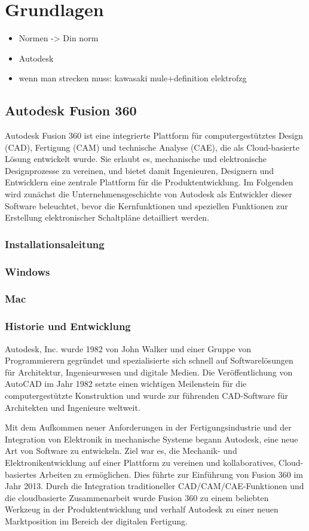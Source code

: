 \chapter{Grundlagen}
\label{cha:Grundlagen}
	\begin{itemize}
	\item Normen -> Din norm
	\item Autodesk
	\item wenn man strecken muss: kawasaki mule+definition elektrofzg
\end{itemize}
\section{Autodesk Fusion 360}
\label{Autodesk}
Autodesk Fusion 360 ist eine integrierte Plattform für computergestütztes Design (CAD), Fertigung (CAM) und technische Analyse (CAE), die als Cloud-basierte Lösung entwickelt wurde. Sie erlaubt es, mechanische und elektronische Designprozesse zu vereinen, und bietet damit Ingenieuren, Designern und Entwicklern eine zentrale Plattform für die Produktentwicklung. Im Folgenden wird zunächst die Unternehmensgeschichte von Autodesk als Entwickler dieser Software beleuchtet, bevor die Kernfunktionen und speziellen Funktionen zur Erstellung elektronischer Schaltpläne detailliert werden.
\subsection{Installationsaleitung}
\subsection*{Windows}
\subsection*{Mac}
\subsection{Historie und Entwicklung}
Autodesk, Inc. wurde 1982 von John Walker und einer Gruppe von Programmierern gegründet und spezialisierte sich schnell auf Softwarelösungen für Architektur, Ingenieurwesen und digitale Medien. \autocite{wikipedia_autodesk}
Die Veröffentlichung von AutoCAD im Jahr 1982 setzte einen wichtigen Meilenstein für die computergestützte Konstruktion und wurde zur führenden CAD-Software für Architekten und Ingenieure weltweit.\autocite{wikipedia_autocad_version_history}


Mit dem Aufkommen neuer Anforderungen in der Fertigungsindustrie und der Integration von Elektronik in mechanische Systeme begann Autodesk, eine neue Art von Software zu entwickeln. Ziel war es, die Mechanik- und Elektronikentwicklung auf einer Plattform zu vereinen und kollaboratives, Cloud-basiertes Arbeiten zu ermöglichen. Dies führte zur Einführung von Fusion 360 im Jahr 2013. \autocite{wikipedia_autodesk_deutsch}
Durch die Integration traditioneller CAD/CAM/CAE-Funktionen und die cloudbasierte Zusammenarbeit wurde Fusion 360 zu einem beliebten Werkzeug in der Produktentwicklung und verhalf Autodesk zu einer neuen Marktposition im Bereich der digitalen Fertigung.
